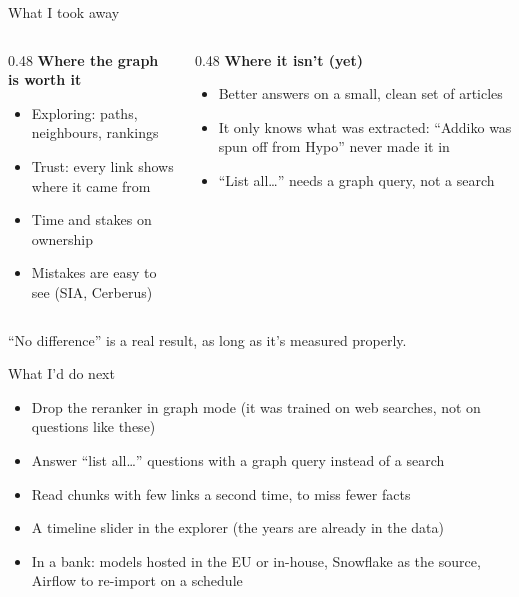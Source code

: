 \documentclass[aspectratio=169,11pt]{beamer}
\newcommand{\hl}[1]{\textcolor{midblue}{\textbf{#1}}}
\begin{document}
\begin{frame}{What I took away}
  \begin{columns}[T]
    \begin{column}{0.48\textwidth}
      \hl{Where the graph is worth it}
      \begin{itemize}\small
        \item Exploring: paths, neighbours, rankings
        \item Trust: every link shows where it came from
        \item Time and stakes on ownership
        \item Mistakes are easy to see (SIA, Cerberus)
      \end{itemize}
    \end{column}
    \begin{column}{0.48\textwidth}
      \hl{Where it isn't (yet)}
      \begin{itemize}\small
        \item Better answers on a small, clean set of articles
        \item It only knows what was extracted: ``Addiko was spun off from Hypo'' never made it in
        \item ``List all\ldots'' needs a graph query, not a search
      \end{itemize}
    \end{column}
  \end{columns}
  \vspace{10pt}
  \centering\small
  ``No difference'' is a real result, as long as it's measured properly.
\end{frame}

\begin{frame}{What I'd do next}
  \begin{itemize}
    \item Drop the reranker in graph mode (it was trained on web searches, not on questions like these)
    \item Answer ``list all\ldots'' questions with a graph query instead of a search
    \item Read chunks with few links a second time, to miss fewer facts
    \item A timeline slider in the explorer (the years are already in the data)
    \item In a bank: models hosted in the EU or in-house, Snowflake as the source,
          Airflow to re-import on a schedule
  \end{itemize}
\end{frame}
\end{document}
